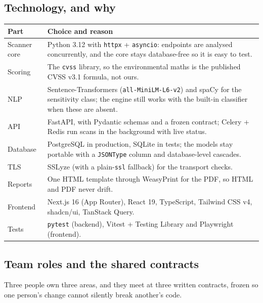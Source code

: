 \subsection{Technology, and why}
\begin{center}
\small
\begin{tabularx}{\linewidth}{@{}p{34mm}X@{}}
\toprule
\textbf{Part} & \textbf{Choice and reason}\\
\midrule
Scanner core & Python 3.12 with \texttt{httpx} + \texttt{asyncio}: endpoints are analysed concurrently, and the core stays database-free so it is easy to test.\\
Scoring & The \texttt{cvss} library, so the environmental maths is the published CVSS v3.1 formula, not ours.\\
NLP & Sentence-Transformers (\texttt{all-MiniLM-L6-v2}) and spaCy for the sensitivity class; the engine still works with the built-in classifier when these are absent.\\
API & FastAPI, with Pydantic schemas and a frozen contract; Celery + Redis run scans in the background with live status.\\
Database & PostgreSQL in production, SQLite in tests; the models stay portable with a \texttt{JSONType} column and database-level cascades.\\
TLS & SSLyze (with a plain-\texttt{ssl} fallback) for the transport checks.\\
Reports & One HTML template through WeasyPrint for the PDF, so HTML and PDF never drift.\\
Frontend & Next.js 16 (App Router), React 19, TypeScript, Tailwind CSS v4, shadcn/ui, TanStack Query.\\
Tests & \texttt{pytest} (backend), Vitest + Testing Library and Playwright (frontend).\\
\bottomrule
\end{tabularx}
\end{center}

\subsection{Team roles and the shared contracts}
Three people own three areas, and they meet at three written contracts, frozen
so one person's change cannot silently break another's code.

